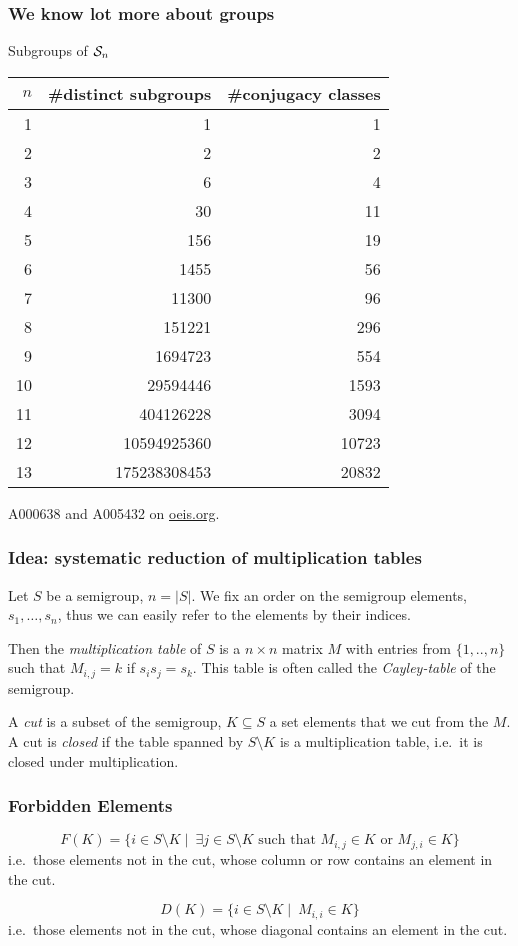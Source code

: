 \documentclass{beamer}
\newcommand{\cS}{{\cal S}}
\newcommand{\jump}{\vskip6pt}
\begin{document}
\begin{frame}\frametitle{We know lot more about groups}
Subgroups of $\cS_n$

\begin{tabular}{r|r|r}
$n$ & \#distinct subgroups & \#conjugacy classes\\
\hline
1& 1 & 1\\
2& 2&2\\
3& 6&4\\
4& 30&11\\
5& 156&19\\
6& 1455&56\\
7& 11300&96\\
8& 151221&296\\
9& 1694723&554\\
10& 29594446&1593\\
11& 404126228&3094\\
12& 10594925360&10723\\
13& 175238308453&20832
\end{tabular}

A000638 and A005432 on \url{oeis.org}.
\end{frame}

\begin{frame}\frametitle{Idea: systematic reduction of multiplication tables}
Let $S$ be a semigroup, $n=|S|$. We fix an order on the semigroup elements, $s_1,\ldots, s_n$, thus we can easily refer to the elements by their indices. 
\begin{definition}
Then the  \emph{multiplication table} of $S$ is a $n\times n$ matrix $M$ with entries from $\{1,..,n\}$ such that $M_{i,j}=k$ if $s_is_j=s_k$. This table is often called the \emph{Cayley-table} of the semigroup.
\end{definition}

\begin{definition}
A \emph{cut} is a subset of the semigroup, $K\subseteq S$ a set elements that we cut from the $M$.  A cut is \emph{closed} if the table spanned by $S\setminus K$ is a multiplication table, i.e.\ it is closed under multiplication.
\end{definition}
\end{frame}

\begin{frame}\frametitle{Forbidden Elements}

\begin{definition}
$$F(K)=\{i\in S\setminus K \mid\ \exists j\in S\setminus K \text{ such that } M_{i,j}\in K \text{ or } M_{j,i}\in K\} $$
\noindent i.e.\ those elements not in the cut, whose column or row contains an element in the cut.
\end{definition}


\begin{definition}
$$D(K)=\{i\in S\setminus K \mid\ M_{i,i}\in K \} $$
\noindent i.e.\ those elements not in the cut, whose diagonal contains an element in the cut.
\end{definition}
\end{frame}
\end{document}
